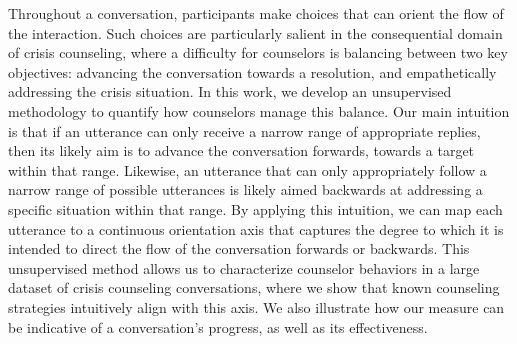 Throughout a conversation, participants make choices that can orient the flow of the interaction. Such choices are particularly salient in the consequential domain of crisis counseling, where a difficulty for counselors is balancing between two key objectives: advancing the conversation towards a resolution, and empathetically addressing the crisis situation. In this work, we develop an unsupervised methodology to quantify how counselors manage this balance. Our main intuition is that if an utterance can only receive a narrow range of appropriate replies, then its likely aim is to advance the conversation forwards, towards a target within that range. Likewise, an utterance that can only appropriately follow a narrow range of possible utterances is likely aimed backwards at addressing a specific situation within that range. By applying this intuition, we can map each utterance to a continuous orientation axis that captures the degree to which it is intended to direct the flow of the conversation forwards or backwards. This unsupervised method allows us to characterize counselor behaviors in a large dataset of crisis counseling conversations, where we show that known counseling strategies intuitively align with this axis. We also illustrate how our measure can be indicative of a conversation's progress, as well as its effectiveness.

